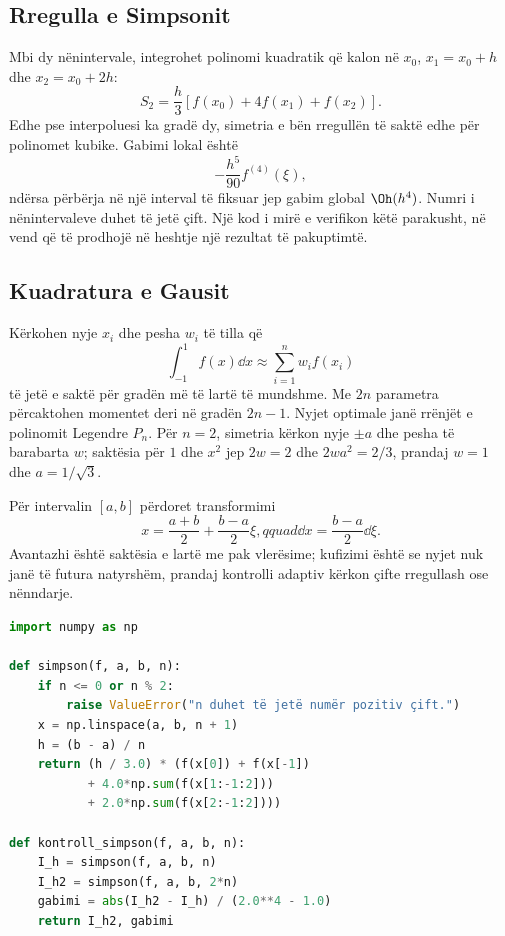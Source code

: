 \subsection{Rregulla e Simpsonit}
Mbi dy nënintervale, integrohet polinomi kuadratik që kalon në $x_0$, $x_1=x_0+h$ dhe $x_2=x_0+2h$:
\begin{equation}
 S_2=\frac{h}{3}[f(x_0)+4f(x_1)+f(x_2)].
\end{equation}
Edhe pse interpoluesi ka gradë dy, simetria e bën rregullën të saktë edhe për polinomet kubike. Gabimi lokal është
\begin{equation}
 -\frac{h^5}{90}f^{(4)}(\xi),
\end{equation}
ndërsa përbërja në një interval të fiksuar jep gabim global $\Oh(h^4)$. Numri i nënintervaleve duhet të jetë çift. Një kod i mirë e verifikon këtë parakusht, në vend që të prodhojë në heshtje një rezultat të pakuptimtë.

\subsection{Kuadratura e Gausit}
Kërkohen nyje $x_i$ dhe pesha $w_i$ të tilla që
\begin{equation}
 \int_{-1}^{1}f(x)\dd x\approx\sum_{i=1}^{n}w_if(x_i)
\end{equation}
të jetë e saktë për gradën më të lartë të mundshme. Me $2n$ parametra përcaktohen momentet deri në gradën $2n-1$. Nyjet optimale janë rrënjët e polinomit Legendre $P_n$. Për $n=2$, simetria kërkon nyje $\pm a$ dhe pesha të barabarta $w$; saktësia për $1$ dhe $x^2$ jep $2w=2$ dhe $2wa^2=2/3$, prandaj $w=1$ dhe $a=1/\sqrt3$.

Për intervalin $[a,b]$ përdoret transformimi
\begin{equation}
 x=\frac{a+b}{2}+\frac{b-a}{2}\xi,qquad
 \dd x=\frac{b-a}{2}\dd\xi.
\end{equation}
Avantazhi është saktësia e lartë me pak vlerësime; kufizimi është se nyjet nuk janë të futura natyrshëm, prandaj kontrolli adaptiv kërkon çifte rregullash ose nënndarje.

\begin{lstlisting}[language=Python,caption={Simpson i përbërë me kontroll të dyfishimit të rrjetit.}]
import numpy as np

def simpson(f, a, b, n):
    if n <= 0 or n % 2:
        raise ValueError("n duhet të jetë numër pozitiv çift.")
    x = np.linspace(a, b, n + 1)
    h = (b - a) / n
    return (h / 3.0) * (f(x[0]) + f(x[-1])
           + 4.0*np.sum(f(x[1:-1:2]))
           + 2.0*np.sum(f(x[2:-1:2])))

def kontroll_simpson(f, a, b, n):
    I_h = simpson(f, a, b, n)
    I_h2 = simpson(f, a, b, 2*n)
    gabimi = abs(I_h2 - I_h) / (2.0**4 - 1.0)
    return I_h2, gabimi
\end{lstlisting}

